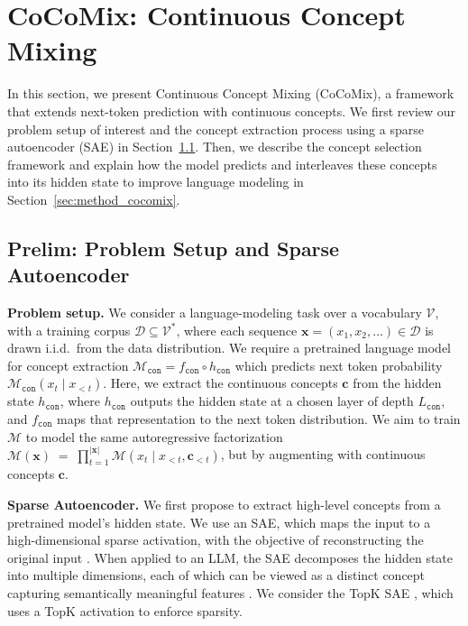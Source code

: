 \documentclass[]{fairmeta}
\def\rvc{{\mathbf{c}}}
\def\rvx{{\mathbf{x}}}
\newcommand{\lname}{Continuous Concept Mixing\xspace}
\newcommand{\mnamefirst}{Continuous Concept Mixing (CoCoMix)\xspace}
\newcommand{\sname}{CoCoMix\xspace}
\begin{document}
\section{\sname: \lname}
\label{sec:method}

In this section, we present \mnamefirst, a framework that extends next-token prediction with continuous concepts. We first review our problem setup of interest and the concept extraction process using a sparse autoencoder (SAE) in Section~\ref{sec:prelim}. Then, we describe the concept selection framework and explain how the model predicts and interleaves these concepts into its hidden state to improve language modeling in Section~\ref{sec:method_cocomix}.

\subsection{Prelim: Problem Setup and Sparse Autoencoder}
\label{sec:prelim}

\textbf{Problem setup.} 
We consider a language-modeling task over a vocabulary $\mathcal{V}$, with a training corpus $\mathcal{D} \subseteq \mathcal{V}^*$, where each sequence $\rvx=(x_{1},x_{2},\ldots)\in \mathcal{D}$ is drawn i.i.d.\ from the data distribution. We require a pretrained language model for concept extraction  $\mathcal{M}_\mathtt{con}=f_\mathtt{con}\circ h_\mathtt{con}$ which predicts next token probability $\mathcal{M}_\mathtt{con}(x_{t} \mid x_{<t})$. Here, we extract the continuous concepts $\rvc$ from the hidden state $h_\mathtt{con}$, where $h_\mathtt{con}$ outputs the hidden state at a chosen layer of depth $L_\mathtt{con}$, and $f_\mathtt{con}$ maps that representation to the next token distribution. We aim to train $\mathcal{M}$ to model the same autoregressive factorization $\mathcal{M}(\rvx) \;=\; \prod_{t=1}^{|\rvx|} \mathcal{M}(x_{t} \mid x_{<t}, \rvc_{<t})$, but by augmenting with continuous concepts $\rvc$.

\textbf{Sparse Autoencoder.}
We first propose to extract high-level concepts from a pretrained model's hidden state. We use an SAE, which maps the input to a high-dimensional sparse activation, with the objective of reconstructing the original input \citep{lee2006efficient}. When applied to an LLM, the SAE decomposes the hidden state into multiple dimensions, each of which can be viewed as a distinct concept capturing semantically meaningful features \citep{yun2021transformer,bricken2023monosemanticity}. We consider the TopK SAE \citep{makhzani2014k}, which uses a TopK activation to enforce sparsity.
\end{document}
